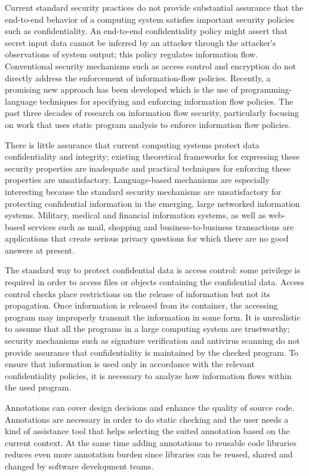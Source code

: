 Current standard security practices do not provide
substantial assurance that the end-to-end behavior of a
computing system satisfies important security policies such as
confidentiality. An end-to-end confidentiality policy might assert
that secret input data cannot be inferred by an attacker through
the attacker's observations of system output; this policy regulates
information flow.
Conventional security mechanisms such as access control
and encryption do not directly address the enforcement of
information-flow policies. Recently, a promising new approach
has been developed which is the use of programming-language techniques
for specifying and enforcing information flow policies.
The past three decades of research on
information flow security, particularly focusing on work that uses
static program analysis to enforce information flow policies. 

There is little assurance that
current computing systems protect data confidentiality and
integrity; existing theoretical frameworks for expressing these
security properties are inadequate and practical techniques for
enforcing these properties are unsatisfactory. Language-based mechanisms are especially interesting because
the standard security mechanisms are unsatisfactory
for protecting confidential information in the emerging, large
networked information systems. Military, medical and financial
information systems, as well as web-based services such
as mail, shopping and business-to-business transactions are
applications that create serious privacy questions for which
there are no good answers at present.

The standard way to protect confidential data is access control: some privilege is required in order to
access files or objects containing the confidential data. Access
control checks place restrictions on the release of information
but not its propagation. Once information is released from
its container, the accessing program may improperly transmit the information in some form. It is
unrealistic to assume that all the programs in a large computing
system are trustworthy; security mechanisms such as signature
verification and antivirus scanning do not provide assurance
that confidentiality is maintained by the checked program. To
ensure that information is used only in accordance with the
relevant confidentiality policies, it is necessary to analyze how
information flows within the used program.

Annotations can cover design decisions and enhance the quality of source code. Annotations are necessary in order to do static checking and the user needs a kind of assistance tool that helps selecting the suited annotation based on the current context. At the same time adding annotations to reusable code libraries reduces even more annotation burden since libraries can be reused, shared and changed by software development teams.

